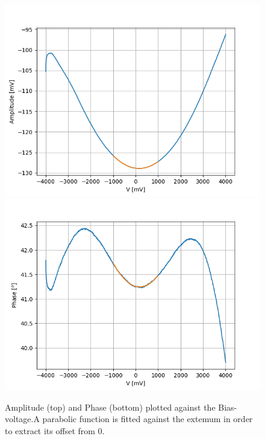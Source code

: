 \documentclass[%
 reprint,
amsmath,amssymb,
pra,
]{revtex4-1}
\begin{document}
\begin{figure}
\centering
\includegraphics[scale=0.5]{Bilder/Magnetic/amplitude.PNG}
\includegraphics[scale=0.5]{Bilder/Magnetic/phase.PNG}
\caption{Amplitude (top) and Phase (bottom) plotted against the Bias-voltage.A parabolic function is fitted against the extemum in order to extract its offset from 0.}
\label{fig:bias}
\end{figure}





\end{document}
